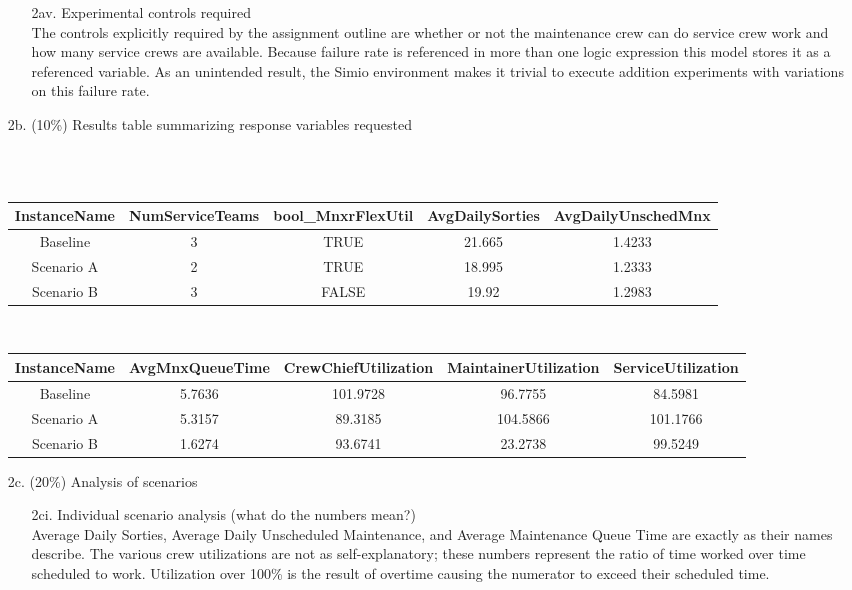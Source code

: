 \documentclass[answers]{exam}
\begin{document}
\begin{questions}
\begin{enumerate}
\begin{solution}
\begin{enumerate}
			\item[2av.] Experimental controls required \\
				The controls explicitly required by the assignment outline are
				whether or not the maintenance crew can do service crew work 
				and how many service crews are available.
				Because failure rate is referenced in more than one logic
				expression this model stores it as a referenced variable.
				As an unintended result, the Simio environment makes it trivial
				to execute addition experiments with variations on this failure rate.
		\end{enumerate}
	\end{solution}
	\item[2b.] (10\%) Results table summarizing response variables requested
	\begin{solution} \\ \phantom{text} \\
		\begin{tabular}{c|cccc}
			\footnotesize InstanceName & \footnotesize NumServiceTeams & \footnotesize bool\_MnxrFlexUtil & 
			\footnotesize AvgDailySorties & \footnotesize AvgDailyUnschedMnx \\
			\midrule
			Baseline   & 3 & TRUE  & 21.665 & 1.4233 \\
			Scenario A & 2 & TRUE  & 18.995 & 1.2333 \\
			Scenario B & 3 & FALSE & 19.92  & 1.2983 \\
		\end{tabular} \phantom{text}
		\bigskip \\
		\begin{tabular}{c|cccc}
			\footnotesize InstanceName & \footnotesize AvgMnxQueueTime & \footnotesize CrewChiefUtilization & 
			\footnotesize MaintainerUtilization & \footnotesize ServiceUtilization  \\
			\midrule
			Baseline   & 5.7636 & 101.9728 & 96.7755  & 84.5981  \\
			Scenario A & 5.3157 & 89.3185  & 104.5866 & 101.1766 \\
			Scenario B & 1.6274 & 93.6741  & 23.2738  & 99.5249  \\
		\end{tabular} \bigskip
		
	\end{solution}
	\item[2c.] (20\%) Analysis of scenarios
	\begin{solution} 
	\begin{enumerate}
		\item[2ci.] Individual scenario analysis (what do the numbers mean?)\\
			Average Daily Sorties, Average Daily Unscheduled Maintenance, and Average Maintenance Queue Time
			are exactly as their names describe.
			The various crew utilizations are not as self-explanatory; 
			these numbers represent the ratio of time worked over
			time scheduled to work.
			Utilization over 100\% is the result of overtime causing the numerator
			to exceed their scheduled time.
		

\end{enumerate}
\end{solution}
\end{enumerate}
\end{questions}
\end{document}
